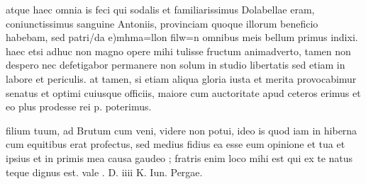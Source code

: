  atque haec omnia is feci qui sodalis et familiarissimus Dolabellae eram, coniunctissimus sanguine Antoniis, provinciam quoque illorum beneficio habebam, sed patri/da e)mh\n ma=llon filw=n omnibus meis bellum primus indixi. haec etsi adhuc non magno opere mihi tulisse fructum animadverto, tamen non despero nec defetigabor permanere non solum in studio libertatis sed etiam in labore et periculis. at tamen, si etiam aliqua gloria iusta et merita provocabimur senatus et optimi cuiusque officiis, maiore cum auctoritate apud ceteros erimus et eo plus prodesse rei p. poterimus.

 filium tuum, ad Brutum cum veni, videre non potui, ideo is quod iam in hiberna cum equitibus erat profectus, sed medius fidius ea esse eum opinione et tua et ipsius et in primis mea causa gaudeo ; fratris enim loco mihi est qui ex te natus teque dignus est. vale . D. iiii K. Iun. Pergae.
